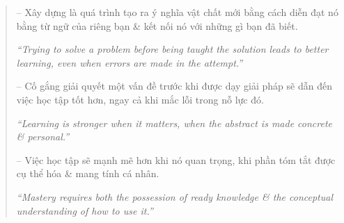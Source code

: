 \documentclass{article}
\begin{document}
\begin{enumerate}
\begin{quotation}
		-- Xây dựng là quá trình tạo ra ý nghĩa vật chất mới bằng cách diễn đạt nó bằng từ ngữ của riêng bạn \& kết nối nó với những gì bạn đã biết.
		
		{\it``Trying to solve a problem before being taught the solution leads to better learning, even when errors are made in the attempt.''}
		
		-- Cố gắng giải quyết một vấn đề trước khi được dạy giải pháp sẽ dẫn đến việc học tập tốt hơn, ngay cả khi mắc lỗi trong nỗ lực đó.
		
		{\it``Learning is stronger when it matters, when the abstract is made concrete \& personal.''}
		
		-- Việc học tập sẽ mạnh mẽ hơn khi nó quan trọng, khi phần tóm tắt được cụ thể hóa \& mang tính cá nhân.
		
		{\it``Mastery requires both the possession of ready knowledge \& the conceptual understanding of how to use it.''}
		

\end{quotation}
\end{enumerate}
\end{document}
